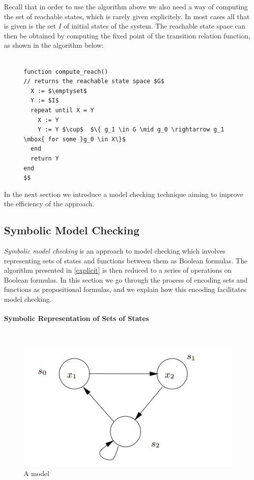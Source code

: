 \documentclass[11pt]{report}
\newcommand{\myparagraph}[1]{\paragraph{#1}\mbox{}\\}
\begin{document}
Recall that in order to use the algorithm above we also need a way of computing the set of reachable states, which is rarely given explicitely. In most cases all that is given is the set $I$ of initial states of the system. The reachable state space can then be obtained by computing the fixed point of the transition relation function, as shown in the algorithm below:
\begin{figure}

\begin{lstlisting}[mathescape]

function compute_reach()
// returns the reachable state space $G$ 
  X := $\emptyset$
  Y := $I$
  repeat until X = Y
    X := Y
    Y := Y $\cup$  $\{ g_1 \in G \mid g_0 \rightarrow g_1 \mbox{ for some }g_0 \in X\}$
  end
  return Y
end
$$
\end{lstlisting}
\end{figure}

In the next section we introduce a model checking technique aiming to improve the efficiency of the approach. 



\subsection{Symbolic Model Checking}

\textit{Symbolic model checking} is an approach to model checking which involves representing sets of states and functions between them as Boolean formulas. The algorithm presented in \ref{explicit} is then reduced to a series of operations on Boolean formulas. In this section we go through the process of encoding sets and functions as propositional formulas, and we explain how this encoding facilitates model checking.

\myparagraph{Symbolic Representation of Sets of States}
\label{symbolic}
\begin{figure}
    \centering
    \includegraphics[scale=0.55]{symbolic_model_checking_example.PNG}
    \caption{A model}
    \label{fig:model_example}
\end{figure}
\end{document}
